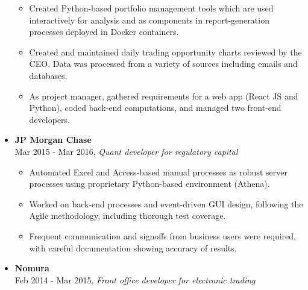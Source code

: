 \documentclass[margin]{res}
\def\tightlist{}
\begin{document}
\begin{resume}
\begin{itemize}
  \begin{itemize}
  \tightlist
  \item
    Created Python-based portfolio management tools which are used
    interactively for analysis and as components in report-generation
    processes deployed in Docker containers.
  \item
    Created and maintained daily trading opportunity charts reviewed by
    the CEO. Data was processed from a variety of sources including
    emails and databases.
  \item
    As project manager, gathered requirements for a web app (React JS
    and Python), coded back-end computations, and managed two front-end
    developers.
  \end{itemize}
\item
  \textbf{JP Morgan Chase}\\
  Mar 2015 - Mar 2016, \emph{Quant developer for regulatory capital}

  \begin{itemize}
  \tightlist
  \item
    Automated Excel and Access-based manual processes as robust server
    processes using proprietary Python-based environment (Athena).
  \item
    Worked on back-end processes and event-driven GUI design, following
    the Agile methodology, including thorough test coverage.
  \item
    Frequent communication and signoffs from business users were
    required, with careful documentation showing accuracy of results.
  \end{itemize}
\item
  \textbf{Nomura}\\
  Feb 2014 - Mar 2015, \emph{Front office developer for electronic
  trading}


\end{itemize}
\end{resume}
\end{document}
